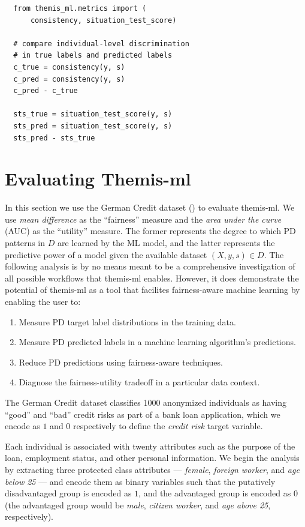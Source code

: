 \documentclass[man,natbib]{apa6}
\begin{document}
\begin{verbatim}
  from themis_ml.metrics import (
      consistency, situation_test_score)

  # compare individual-level discrimination
  # in true labels and predicted labels
  c_true = consistency(y, s)
  c_pred = consistency(y, s)
  c_pred - c_true

  sts_true = situation_test_score(y, s)
  sts_pred = situation_test_score(y, s)
  sts_pred - sts_true
\end{verbatim}

\section{Evaluating Themis-ml}

In this section we use the German Credit dataset (\citealp{bache2013uci}) to evaluate
themis-ml. We use \emph{mean difference} as the ``fairness'' measure and the
\emph{area under the curve} (AUC) as the ``utility'' measure. The former
represents the degree to which PD patterns in \(D\) are learned by the ML model,
and the latter represents the predictive power of a model given the available
dataset \((X, y, s) \in D\). The following analysis is by no means meant to be a
comprehensive investigation of all possible workflows that themis-ml enables.
However, it does demonstrate the potential of themis-ml as a tool that facilites
fairness-aware machine learning by enabling the user to:

\begin{enumerate}
  \item Measure PD target label distributions in the training data.
  \item Measure PD predicted labels in a machine learning algorithm's predictions.
  \item Reduce PD predictions using fairness-aware techniques.
  \item Diagnose the fairness-utility tradeoff in a particular data context.
\end{enumerate}

The German Credit dataset classifies 1000 anonymized individuals as having
``good'' and ``bad'' credit risks as part of a bank loan application, which we
encode as \(1\) and \(0\) respectively to define the \emph{credit risk}
target variable.

Each individual is associated with twenty attributes such as the purpose of the
loan, employment status, and other personal information. We begin the analysis
by extracting three protected class attributes --- \emph{female},
\emph{foreign worker}, and \emph{age below 25} --- and encode them as binary
variables such that the putatively disadvantaged group is encoded as \(1\), and
the advantaged group is encoded as \(0\) (the advantaged group would be
\emph{male}, \emph{citizen worker}, and \emph{age above 25}, respectively).
\end{document}
